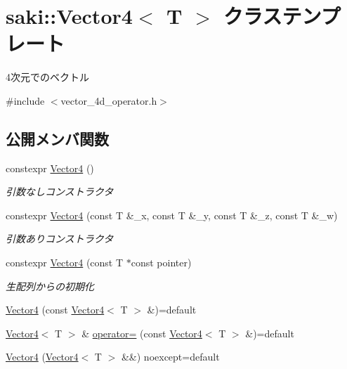 \hypertarget{classsaki_1_1_vector4}{}\section{saki\+:\+:Vector4$<$ T $>$ クラステンプレート}
\label{classsaki_1_1_vector4}


4次元でのベクトル  




{\ttfamily \#include $<$vector\+\_\+4d\+\_\+operator.\+h$>$}

\subsection*{公開メンバ関数}
\begin{DoxyCompactItemize}
\item 
constexpr \mbox{\hyperlink{classsaki_1_1_vector4_a9e8579274314ee2639d60c501c8ecf61}{Vector4}} ()
\begin{DoxyCompactList}\small\item\em 引数なしコンストラクタ \end{DoxyCompactList}\item 
constexpr \mbox{\hyperlink{classsaki_1_1_vector4_abbab45ef6d7c95d150c3e76eb241a666}{Vector4}} (const T \&\+\_\+x, const T \&\+\_\+y, const T \&\+\_\+z, const T \&\+\_\+w)
\begin{DoxyCompactList}\small\item\em 引数ありコンストラクタ \end{DoxyCompactList}\item 
constexpr \mbox{\hyperlink{classsaki_1_1_vector4_abc0ccb1bdc06d795177dcbc800845873}{Vector4}} (const T $\ast$const pointer)
\begin{DoxyCompactList}\small\item\em 生配列からの初期化 \end{DoxyCompactList}\item 
\mbox{\hyperlink{classsaki_1_1_vector4_a1bb4d03830bdb84341a001ef4c9b6fab}{Vector4}} (const \mbox{\hyperlink{classsaki_1_1_vector4}{Vector4}}$<$ T $>$ \&)=default
\item 
\mbox{\hyperlink{classsaki_1_1_vector4}{Vector4}}$<$ T $>$ \& \mbox{\hyperlink{classsaki_1_1_vector4_a21105aa4ba724daa7c1ab708083f996b}{operator=}} (const \mbox{\hyperlink{classsaki_1_1_vector4}{Vector4}}$<$ T $>$ \&)=default
\item 
\mbox{\hyperlink{classsaki_1_1_vector4_afc0bf46f0fefeae2f6f21288f6714580}{Vector4}} (\mbox{\hyperlink{classsaki_1_1_vector4}{Vector4}}$<$ T $>$ \&\&) noexcept=default

\end{DoxyCompactItemize}
